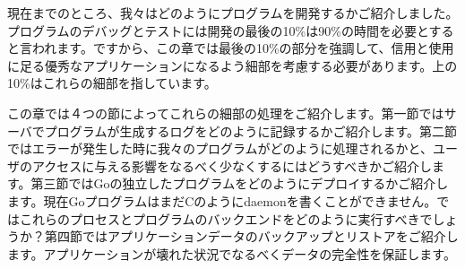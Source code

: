 現在までのところ、我々はどのようにプログラムを開発するかご紹介しました。プログラムのデバッグとテストには開発の最後の10\%は90\%の時間を必要とすると言われます。ですから、この章では最後の10\%の部分を強調して、信用と使用に足る優秀なアプリケーションになるよう細部を考慮する必要があります。上の10\%はこれらの細部を指しています。

この章では４つの節によってこれらの細部の処理をご紹介します。第一節ではサーバでプログラムが生成するログをどのように記録するかご紹介します。第二節ではエラーが発生した時に我々のプログラムがどのように処理されるかと、ユーザのアクセスに与える影響をなるべく少なくするにはどうすべきかご紹介します。第三節ではGoの独立したプログラムをどのようにデプロイするかご紹介します。現在GoプログラムはまだCのようにdaemonを書くことができません。ではこれらのプロセスとプログラムのバックエンドをどのように実行すべきでしょうか？第四節ではアプリケーションデータのバックアップとリストアをご紹介します。アプリケーションが壊れた状況でなるべくデータの完全性を保証します。
